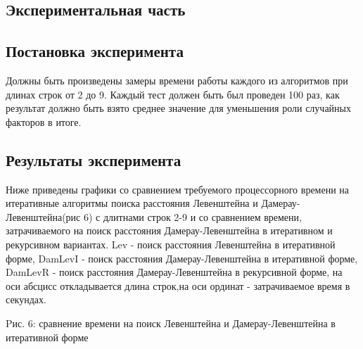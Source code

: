 \documentclass[a4paper, 14pt]{article}
\begin{document}
    \begin{center}
    	\newpage
        \section{Экспериментальная часть}
		\subsection{Постановка эксперимента}
		\begin{flushleft}
		\parindent=1cm
		Должны быть произведены замеры времени работы каждого из алгоритмов при длинах строк от 2 до 9. Каждый тест должен быть был проведен 100 раз, как результат должно быть взято среднее значение для уменьшения роли случайных факторов в итоге.\\
		\end{flushleft}		
		\subsection{Результаты эксперимента}		
		\begin{flushleft}
		Ниже приведены графики со сравнением требуемого процессорного времени на итеративные алгоритмы поиска расстояния Левенштейна и Дамерау-Левенштейна(рис 6) с длитнами строк 2-9 и со сравнением времени, затрачиваемого на поиск расстояния Дамерау-Левенштейна в итеративном и рекурсивном вариантах.	Lev - поиск расстояния  Левенштейна в итеративной форме,		DamLevI - поиск расстояния Дамерау-Левенштейна в итеративной форме,
		DamLevR - поиск расстояния Дамерау-Левенштейна в рекурсивной форме,
		на оси абсцисс откладывается длина строк,на оси ординат - затрачиваемое время в секундах. 
				\end{flushleft}
\begin{center}
Pис. 6: сравнение времени на поиск Левенштейна и Дамерау-Левенштейна в итеративной форме
\end{center}
\begin{tikzpicture}


\end{tikzpicture}
\end{center}
\end{document}
